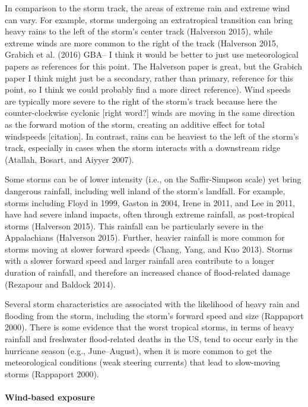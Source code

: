 \documentclass[]{elsarticle} %
\begin{document}
In comparison to the storm track, the areas of extreme rain and extreme
wind can vary. For example, storms undergoing an extratropical
transition can bring heavy rains to the left of the storm's center track
(Halverson 2015), while extreme winds are more common to the right of
the track (Halverson 2015, Grabich et al. (2016) GBA-- I think it would
be better to just use meteorological papers as references for this
point. The Halverson paper is great, but the Grabich paper I think might
just be a secondary, rather than primary, reference for this point, so I
think we could probably find a more direct reference). Wind speeds are
typically more severe to the right of the storm's track because here the
counter-clockwise cyclonic {[}right word?{]} winds are moving in the
same direction as the forward motion of the storm, creating an additive
effect for total windspeeds {[}citation{]}. In contrast, rains can be
heaviest to the left of the storm's track, especially in cases when the
storm interacts with a downstream ridge (Atallah, Bosart, and Aiyyer
2007).

Some storms can be of lower intensity (i.e., on the Saffir-Simpson
scale) yet bring dangerous rainfall, including well inland of the
storm's landfall. For example, storms including Floyd in 1999, Gaston in
2004, Irene in 2011, and Lee in 2011, have had severe inland impacts,
often through extreme rainfall, as post-tropical storms (Halverson
2015). This rainfall can be particularly severe in the Appalachians
(Halverson 2015). Further, heavier rainfall is more common for storms
moving at slower forward speeds (Chang, Yang, and Kuo 2013). Storms with
a slower forward speed and larger rainfall area contribute to a longer
duration of rainfall, and therefore an increased chance of flood-related
damage (Rezapour and Baldock 2014).

Several storm characteristics are associated with the likelihood of
heavy rain and flooding from the storm, including the storm's forward
speed and size (Rappaport 2000). There is some evidence that the worst
tropical storms, in terms of heavy rainfall and freshwater flood-related
deaths in the US, tend to occur early in the hurricane season (e.g.,
June--August), when it is more common to get the meteorological
conditions (weak steering currents) that lead to slow-moving storms
(Rappaport 2000).

\paragraph{Wind-based exposure}\label{wind-based-exposure-1}
\end{document}
